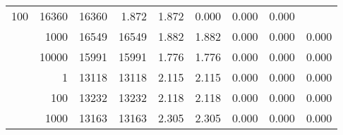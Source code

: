\begin{table}
\begin{tabular}{rrrrrrrrr}
					\multirow{ 1 }{*}{ 100 } &
					
						
							    
							     16360  & 16360  
	                           & 1.872 & 1.872 & 0.000
	                           & 0.000 & 0.000  \\
	                
	            
					 &  
					 
					\multirow{ 1 }{*}{ 1000 } &
					
						
							    
							     16549  & 16549  
	                           & 1.882 & 1.882 & 0.000
	                           & 0.000 & 0.000  \\
	                
	            
					 &  
					 
					\multirow{ 1 }{*}{ 10000 } &
					
						
							    
							     15991  & 15991  
	                           & 1.776 & 1.776 & 0.000
	                           & 0.000 & 0.000  \\
	                
	            
	        
				\noalign{\smallskip}\hline
				\multirow{ 4 }{*}{ 250000 } &
				
					
					 
					\multirow{ 1 }{*}{ 1 } &
					
						
							    
							     13118  & 13118  
	                           & 2.115 & 2.115 & 0.000
	                           & 0.000 & 0.000  \\
	                
	            
					 &  
					 
					\multirow{ 1 }{*}{ 100 } &
					
						
							    
							     13232  & 13232  
	                           & 2.118 & 2.118 & 0.000
	                           & 0.000 & 0.000  \\
	                
	            
					 &  
					 
					\multirow{ 1 }{*}{ 1000 } &
					
						
							    
							     13163  & 13163  
	                           & 2.305 & 2.305 & 0.000
	                           & 0.000 & 0.000  \\
	                

\end{tabular}
\end{table}
